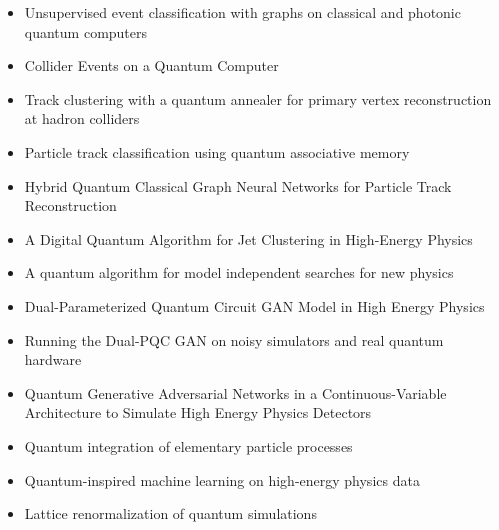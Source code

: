 \begin{itemize}
   \item Unsupervised event classification with graphs on classical and photonic quantum computers~\cite{Blance:2020ktp}
   \item Collider Events on a Quantum Computer~\cite{Gustafson:2022xwt}
   \item Track clustering with a quantum annealer for primary vertex reconstruction at hadron colliders~\cite{Das:2019hrw}
   \item Particle track classification using quantum associative memory~\cite{Quiroz:2020jmp}
   \item Hybrid Quantum Classical Graph Neural Networks for Particle Track Reconstruction~\cite{Tuysuz:2021oai}
   \item A Digital Quantum Algorithm for Jet Clustering in High-Energy Physics~\cite{Pires:2021fka}
   \item A quantum algorithm for model independent searches for new physics~\cite{Matchev:2020wwx}
   \item Dual-Parameterized Quantum Circuit GAN Model in High Energy Physics~\cite{Chang:2021ufg}
   \item Running the Dual-PQC GAN on noisy simulators and real quantum hardware~\cite{Chang:2022dxc}
   \item Quantum Generative Adversarial Networks in a Continuous-Variable Architecture to Simulate High Energy Physics Detectors~\cite{Chang:2021jne}
   \item Quantum integration of elementary particle processes~\cite{Agliardi:2022ghn}
   \item Quantum-inspired machine learning on high-energy physics data~\cite{Felser:2020mka}
   \item Lattice renormalization of quantum simulations~\cite{Carena:2021ltu}
\end{itemize}



